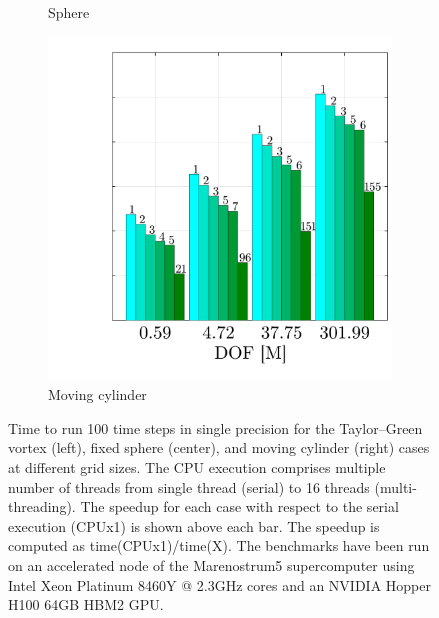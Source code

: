 \documentclass[final,3p,times]{elsarticle}
\begin{document}
\begin{figure}[!t]
\begin{subfigure}[t]{0.33\linewidth}
    \caption{Sphere}
  \end{subfigure}
  \begin{subfigure}[t]{0.33\linewidth}
    \centering\hspace*{-0.2cm}
    \includegraphics[width=\linewidth]{img/cylinder_benchmark.pdf}
    \caption{Moving cylinder}
  \end{subfigure}
	\caption{Time to run 100 time steps in single precision for the Taylor--Green vortex (left), fixed sphere (center), and moving cylinder (right) cases at different grid sizes. The CPU execution comprises multiple number of threads from single thread (serial) to 16 threads (multi-threading). The speedup for each case with respect to the serial execution (CPUx1) is shown above each bar. The speedup is computed as time(CPUx1)/time(X). The benchmarks have been run on an accelerated node of the Marenostrum5 supercomputer using Intel Xeon Platinum 8460Y @ 2.3GHz cores and an NVIDIA Hopper H100 64GB HBM2 GPU.}
	\label{fig:benchmarks}
\end{figure}
\end{document}
